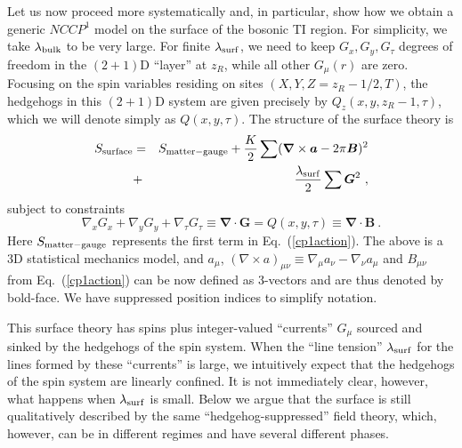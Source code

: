 \documentclass[prb,twocolumn]{revtex4-1}
\begin{document}
Let us now proceed more systematically and, in particular, show how we obtain a generic $NCCP^1$ model on the surface of the bosonic TI region.  For simplicity, we take $\lambda_{\rm bulk}$ to be very large. For finite $\lambda_{\rm surf}$, we need to keep $G_x, G_y, G_\tau$ degrees of freedom in the $(2+1)$D ``layer'' at $z_R$, while all other $G_\mu(r)$ are zero.  Focusing on the spin variables residing on sites $(X, Y, Z=z_R-1/2, T)$, the hedgehogs in this $(2+1)$D system are given precisely by $Q_z(x, y, z_R-1, \tau)$, which we will denote simply as $Q(x, y, \tau)$.  The structure of the surface theory is
\begin{eqnarray}
S_{\rm surface} &=& S_{\rm matter-gauge} + \frac{K}{2}\sum  ({\bm\nabla} \times {\bm a} - 2\pi {\bm B})^2\nonumber \\
&+& \frac{\lambda_{\rm surf}}{2}\sum  {\bm G}^2 ~,
\label{lesikeqn}
\end{eqnarray}
subject to constraints
\begin{equation}
 \nabla_x G_x + \nabla_y G_y + \nabla_\tau G_\tau \equiv {\bm \nabla} \cdot {\bm G} = Q(x,y,\tau) \equiv {\bm \nabla} \cdot {\bm B} ~.
\end{equation}
Here $S_{\rm matter-gauge}$ represents the first term in Eq.~(\ref{cp1action}). The above is a 3D statistical mechanics model, and $a_\mu$, $(\nabla\times a)_{\mu\nu} \equiv \nabla_\mu a_\nu -\nabla_\nu a_\mu$ and $B_{\mu\nu}$ from Eq.~(\ref{cp1action}) can be now defined as 3-vectors and are thus denoted by bold-face. We have suppressed position indices to simplify notation.

This surface theory has spins plus integer-valued ``currents'' $G_\mu$ sourced and sinked by the hedgehogs of the spin system.  When the ``line tension'' $\lambda_{\rm surf}$ for the lines formed by these ``currents'' is large, we intuitively expect that the hedgehogs of the spin system are linearly confined.  It is not immediately clear, however, what happens when $\lambda_{\rm surf}$ is small.  Below we argue that the surface is still qualitatively described by the same ``hedgehog-suppressed'' field theory, which, however, can be in different regimes and have several different phases.
\end{document}
